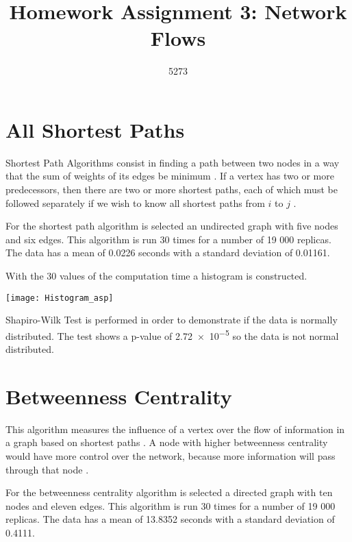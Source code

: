 \documentclass[10pt,a4paper,openany]{article}
\author{5273}
\title{Homework Assignment 3: Network Flows}
\date{}
\begin{document}
	
\maketitle
	\section*{All Shortest Paths}
	 
	Shortest Path Algorithms consist in finding a path between two nodes in a way that the sum of weights of its edges be minimum \citep{schmidt1995all}. If a vertex has two or more predecessors, then there are two or more shortest paths, each of which must be followed separately if we wish to know all shortest paths from $i$ to $j$ \citep{newman2001scientific}.
	
	
	
	For the shortest path algorithm is selected an undirected graph with five nodes and six edges. This algorithm is run 30 times for a number of 19 000 replicas. The data has a mean of 0.0226 seconds with a standard deviation of 0.01161.
	
	With the 30 values of the computation time a histogram is constructed.
	
	\begin{center}
		\texttt{[image: Histogram\_asp]}
	\end{center}
	
	Shapiro-Wilk Test is performed in order to demonstrate if the data is normally distributed. The test shows a p-value of \num{2.72e-5} so the data is not normal distributed.
	
\newpage
	
	\section*{Betweenness Centrality}
	
	This algorithm measures the influence of a vertex over the flow of information in a graph based on shortest paths \citep{unnithan2014betweenness}. A node with higher betweenness centrality would have more control over the network, because more information will pass through that node \citep{freeman1977set}.
	
	
	
	For the betweenness centrality algorithm is selected a directed graph with ten nodes and eleven edges. This algorithm is run 30 times for a number of 19 000 replicas. The data has a mean of 13.8352 seconds with a standard deviation of 0.4111.
	
\end{document}
